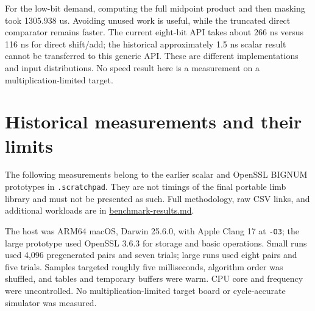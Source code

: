 \documentclass[11pt,a4paper]{article}
\begin{document}
For the low-bit demand, computing the full midpoint product and then masking took 1305.938 us. Avoiding unused work is useful, while the truncated direct comparator remains faster. The current eight-bit API takes about 266 ns versus 116 ns for direct shift/add; the historical approximately 1.5 ns scalar result cannot be transferred to this generic API. These are different implementations and input distributions. No speed result here is a measurement on a multiplication-limited target.

\section{Historical measurements and their limits}

The following measurements belong to the earlier scalar and OpenSSL BIGNUM prototypes in \texttt{.scratchpad}. They are not timings of the final portable limb library and must not be presented as such. Full methodology, raw CSV links, and additional workloads are in \href{\detokenize{benchmark-results.md}}{benchmark-results.md}.

The host was ARM64 macOS, Darwin 25.6.0, with Apple Clang 17 at \texttt{-O3}; the large prototype used OpenSSL 3.6.3 for storage and basic operations. Small runs used 4,096 pregenerated pairs and seven trials; large runs used eight pairs and five trials. Samples targeted roughly five milliseconds, algorithm order was shuffled, and tables and temporary buffers were warm. CPU core and frequency were uncontrolled. No multiplication-limited target board or cycle-accurate simulator was measured.
\end{document}
